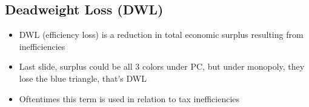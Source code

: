 \documentclass{article}
\begin{document}
\subsection{Deadweight Loss (DWL)}
\begin{itemize}
  \item DWL (efficiency loss) is a reduction in total economic surplus resulting
    from inefficiencies
  \item Last slide, surplus could be all 3 colors under PC, but under monopoly, they
    lose the blue triangle, that's DWL
  \item Oftentimes this term is used in relation to tax inefficiencies
\end{itemize}
\end{document}
